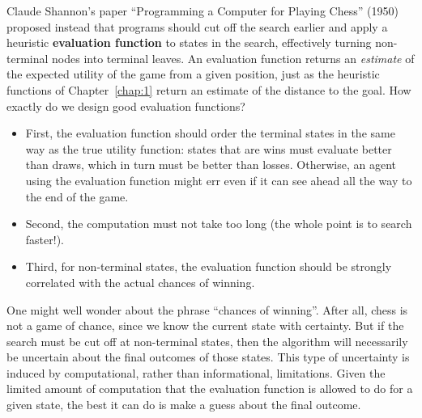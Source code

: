 Claude Shannon's paper ``Programming a Computer for Playing Chess'' (1950) proposed instead that programs should cut off the search earlier and apply a heuristic \textbf{evaluation function} to states in the search, effectively turning non-terminal nodes into terminal leaves.
An evaluation function returns an \emph{estimate} of the expected utility of the game from a given position, just as the heuristic functions of Chapter~\ref{chap:1} return an estimate of the distance to the goal.
How exactly do we design good evaluation functions?
\begin{itemize}
\item First, the evaluation function should order the terminal states in the same way as the true utility function: states that are wins must evaluate better than draws, which in turn must be better than losses. Otherwise, an agent using the evaluation function might err even if it can see ahead all the way to the end of the game.
\item Second, the computation must not take too long (the whole point is to search faster!).
\item Third, for non-terminal states, the evaluation function should be strongly correlated with the actual chances of winning.
\end{itemize}
One might well wonder about the phrase ``chances of winning''. After all, chess is not a game of chance, since we know the current state with certainty. But if the search must be cut off at non-terminal states, then the algorithm will necessarily be uncertain about the final outcomes of those states. This type of uncertainty is induced by computational, rather than informational, limitations. Given the limited amount of computation that the evaluation function is allowed to do for a given state, the best it can do is make a guess about the final outcome.

